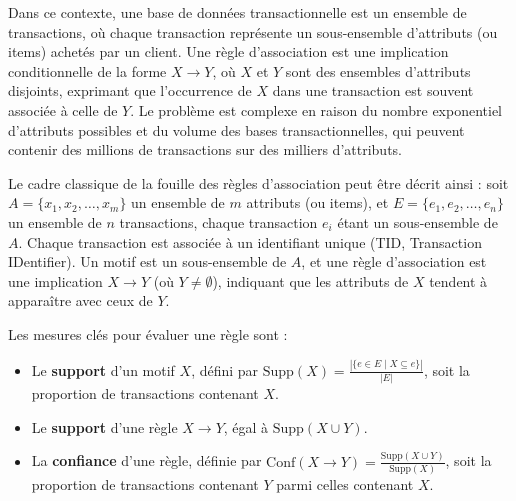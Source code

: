 \documentclass[a4paper,12pt]{article}
\begin{document}
        Dans ce contexte, une base de données transactionnelle est un ensemble de transactions, où chaque transaction représente un sous-ensemble d’attributs (ou items) achetés par un client. Une règle d’association est une implication conditionnelle de la forme \( X \rightarrow Y \), où \( X \) et \( Y \) sont des ensembles d’attributs disjoints, exprimant que l’occurrence de \( X \) dans une transaction est souvent associée à celle de \( Y \). Le problème est complexe en raison du nombre exponentiel d’attributs possibles et du volume des bases transactionnelles, qui peuvent contenir des millions de transactions sur des milliers d’attributs.
        
        
        \label{sec:prob_assoc}
        
        Le cadre classique de la fouille des règles d’association peut être décrit ainsi : soit \( A = \{x_1, x_2, \dots, x_m\} \) un ensemble de \( m \) attributs (ou items), et \( E = \{e_1, e_2, \dots, e_n\} \) un ensemble de \( n \) transactions, chaque transaction \( e_i \) étant un sous-ensemble de \( A \). Chaque transaction est associée à un identifiant unique (TID, Transaction IDentifier). Un motif est un sous-ensemble de \( A \), et une règle d’association est une implication \( X \rightarrow Y \) (où \( Y \neq \emptyset \)), indiquant que les attributs de \( X \) tendent à apparaître avec ceux de \( Y \).
        
        Les mesures clés pour évaluer une règle sont :
        \begin{itemize}
            \item Le \textbf{support} d’un motif \( X \), défini par \( \text{Supp}(X) = \frac{|\{e \in E \mid X \subseteq e\}|}{|E|} \), soit la proportion de transactions contenant \( X \).
            \item Le \textbf{support} d’une règle \( X \rightarrow Y \), égal à \( \text{Supp}(X \cup Y) \).
            \item La \textbf{confiance} d’une règle, définie par \( \text{Conf}(X \rightarrow Y) = \frac{\text{Supp}(X \cup Y)}{\text{Supp}(X)} \), soit la proportion de transactions contenant \( Y \) parmi celles contenant \( X \).
        \end{itemize}
        
\end{document}
